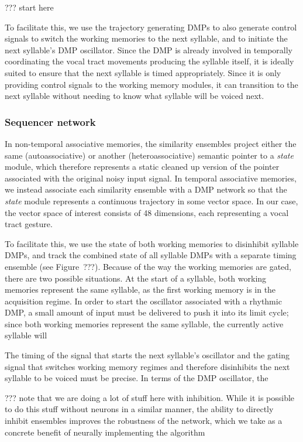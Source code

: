 ??? start here

To facilitate this,
we use the trajectory generating DMPs
to also generate control signals
to switch the working memories
to the next syllable,
and to initiate the next syllable's DMP oscillator.
Since the DMP is already involved in
temporally coordinating
the vocal tract movements
producing the syllable itself,
it is ideally suited to
ensure that the next syllable
is timed appropriately.
Since it is only providing control signals
to the working memory modules,
it can transition to the next syllable
without needing to know
what syllable will be voiced next.



\subsubsection{Sequencer network}

In non-temporal associative memories,
the similarity ensembles
project either the same (autoassociative)
or another (heteroassociative) semantic pointer
to a \textit{state} module,
which therefore represents
a static cleaned up version of the pointer
associated with
the original noisy input signal.
In temporal associative memories,
we instead associate each similarity ensemble
with a DMP network so that
the \textit{state} module
represents a continuous trajectory
in some vector space.
In our case, the vector space of interest
consists of 48 dimensions,
each representing a vocal tract gesture.

To facilitate this,
we use the state of both working memories
to disinhibit syllable DMPs,
and track the combined state of all syllable DMPs
with a separate timing ensemble
(see Figure~???).
Because of the way the working memories
are gated, there are two possible
situations.
At the start of a syllable,
both working memories represent the same syllable,
as the first working memory is in
the acquisition regime.
In order to start the oscillator
associated with a rhythmic DMP,
a small amount of input must be delivered
to push it into its limit cycle;
since both working memories represent
the same syllable, the currently active
syllable will

The timing of
the signal that starts
the next syllable's oscillator
and the gating signal that
switches working memory regimes
and therefore disinhibits
the next syllable to be voiced
must be precise.
In terms of the DMP oscillator,
the


??? note that we are doing a lot of stuff
here with inhibition.
While it is possible to do this stuff
without neurons in a similar manner,
the ability to directly inhibit ensembles
improves the robustness of the network,
which we take as a concrete benefit
of neurally implementing the algorithm

